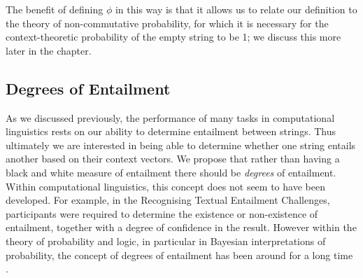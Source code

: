 The benefit of defining $\phi$ in this way is that it allows us to relate our definition to the theory of non-commutative probability, for which it is necessary for the context-theoretic probability of the empty string to be 1; we discuss this more later in the chapter.



\subsection{Degrees of Entailment}

As we discussed previously, the performance of many tasks in computational linguistics rests on our ability to determine entailment between strings. Thus ultimately we are interested in being able to determine whether one string entails another based on their context vectors.
We propose that rather than having a black and white measure of entailment there should be \emph{degrees} of entailment. Within computational linguistics, this concept does not seem to have been developed. For example, in the Recognising Textual Entailment Challenges, participants were required to determine the existence or non-existence of entailment, together with a degree of confidence in the result. However within the theory of probability and logic, in particular in Bayesian interpretations of probability, the concept of degrees of entailment has been around for a long time \citep{Kyburg:01}.

